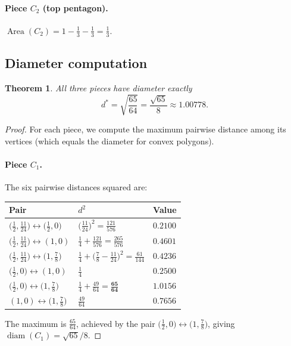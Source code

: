 \documentclass[11pt]{article}
\newtheorem{theorem}{Theorem}
\theoremstyle{definition}
\begin{document}
\paragraph{Piece $C_2$ (top pentagon).}
$\operatorname{Area}(C_2) = 1 - \tfrac{1}{3} - \tfrac{1}{3} = \tfrac{1}{3}$.

\subsection{Diameter computation}

\begin{theorem}
All three pieces have diameter exactly
\[
  d^* = \sqrt{\frac{65}{64}} = \frac{\sqrt{65}}{8} \approx 1.00778.
\]
\end{theorem}

\begin{proof}
For each piece, we compute the maximum pairwise distance among its
vertices (which equals the diameter for convex polygons).

\paragraph{Piece $C_1$.}
The six pairwise distances squared are:
\begin{center}
\begin{tabular}{lll}
\toprule
Pair & $d^2$ & Value \\
\midrule
$\bigl(\frac{1}{2},\frac{11}{24}\bigr) \leftrightarrow \bigl(\frac{1}{2},0\bigr)$
  & $\bigl(\frac{11}{24}\bigr)^2 = \frac{121}{576}$ & $0.2100$ \\[3pt]
$\bigl(\frac{1}{2},\frac{11}{24}\bigr) \leftrightarrow (1,0)$
  & $\frac{1}{4} + \frac{121}{576} = \frac{265}{576}$ & $0.4601$ \\[3pt]
$\bigl(\frac{1}{2},\frac{11}{24}\bigr) \leftrightarrow \bigl(1,\frac{7}{8}\bigr)$
  & $\frac{1}{4} + \bigl(\frac{7}{8}-\frac{11}{24}\bigr)^2 = \frac{61}{144}$ & $0.4236$ \\[3pt]
$\bigl(\frac{1}{2},0\bigr) \leftrightarrow (1,0)$
  & $\frac{1}{4}$ & $0.2500$ \\[3pt]
$\bigl(\frac{1}{2},0\bigr) \leftrightarrow \bigl(1,\frac{7}{8}\bigr)$
  & $\frac{1}{4} + \frac{49}{64} = \mathbf{\frac{65}{64}}$ & $\mathbf{1.0156}$ \\[3pt]
$(1,0) \leftrightarrow \bigl(1,\frac{7}{8}\bigr)$
  & $\frac{49}{64}$ & $0.7656$ \\
\bottomrule
\end{tabular}
\end{center}
The maximum is $\frac{65}{64}$, achieved by the pair
$\bigl(\frac{1}{2},0\bigr) \leftrightarrow \bigl(1,\frac{7}{8}\bigr)$,
giving $\operatorname{diam}(C_1) = \sqrt{65}/8$.


\end{proof}
\end{document}
